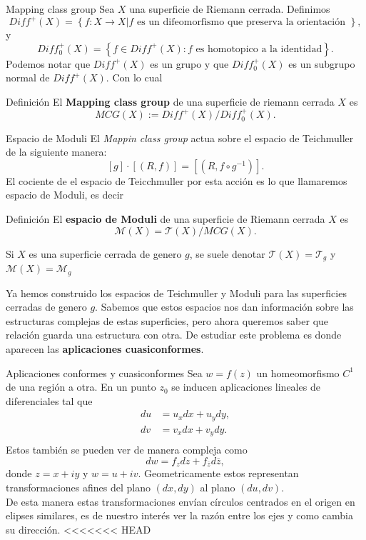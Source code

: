 \documentclass[xcolor=dvipsnames,10pt]{beamer}
\begin{document}
    \begin{frame}{Mapping class group}
        Sea $X$ una superficie de Riemann cerrada. Definimos
        $$Diff^+(X)=\left\{f:X\to X| f \text{ es un difeomorfismo que preserva la orientación }\right\},$$
        y
        $$Diff^+_0(X)=\left\{f\in Diff^+(X):f\text{ es homotopico a la identidad}\right\}.$$
        Podemos notar que $Diff^+(X)$ es un grupo y que $Diff^+_0(X)$ es un subgrupo normal de $Diff^+(X).$ Con lo cual 
        \begin{block}{Definición}
            El \textbf{Mapping class group} de una superficie de riemann cerrada $X$ es
            $$MCG(X):=Diff^+(X)/Diff^+_0(X).$$
        \end{block}
        
    \end{frame}
    \begin{frame}{Espacio de Moduli}
        El \textit{Mappin class group} actua sobre el espacio de Teichmuller de la siguiente manera:
        $$[g]\cdot[(R,f)]=[(R,f\circ g^{-1})].$$
        El cociente de el espacio de Teicchmuller por esta acción es lo que llamaremos espacio de Moduli, es decir
        \begin{block}{Definición}
            El \textbf{espacio de Moduli} de una superficie de Riemann cerrada $X$ es
            $$\mathcal{M}(X)=\mathcal{T}(X)/MCG(X).$$
        \end{block}
        Si $X$ es una superficie cerrada de genero $g$, se suele denotar $\mathcal{T}(X)=\mathcal{T}_g$ y $\mathcal{M}(X)=\mathcal{M}_g$
    \end{frame}
    \begin{frame}
        Ya hemos construido los espacios de Teichmuller y Moduli para las superficies cerradas de genero $g$. Sabemos que estos espacios nos dan información sobre las estructuras complejas de estas superficies, pero ahora queremos saber que relación guarda una estructura con otra. De estudiar este problema es donde aparecen las \textbf{aplicaciones cuasiconformes}.
    \end{frame}

    

\begin{frame}{Aplicaciones conformes y cuasiconformes}
Sea $w=f(z)$ un homeomorfismo $C^1$ de una región a otra. En un punto $z_0$ se inducen aplicaciones lineales de diferenciales tal que
\begin{align*}
    du&=u_xdx+u_ydy,\\
    dv&=v_xdx+v_ydy.\\
\end{align*}
Estos también se pueden ver de manera compleja como
$$dw=f_zdz+f_{\overline{z}}d\overline{z},$$
donde $z=x+iy$ y $w=u+iv.$ Geometricamente  estos representan transformaciones afines del plano $(dx,dy)$ al plano
$(du,dv).$\\

De esta manera estas transformaciones envían círculos centrados en el origen en elipses similares, es de nuestro interés ver la razón entre los ejes y como cambia su dirección.    
<<<<<<< HEAD
\end{frame}
\end{document}
